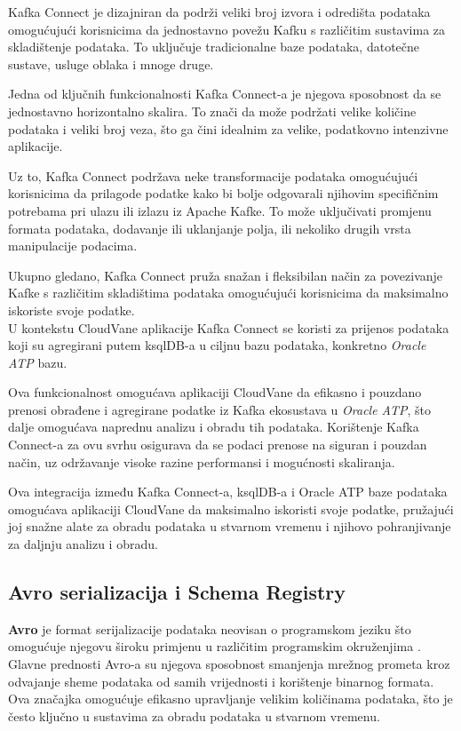 \documentclass[times, utf8, diplomski]{fer}
\begin{document}
Kafka Connect je dizajniran da podrži veliki broj izvora  i odredišta  podataka omogućujući korisnicima da jednostavno povežu Kafku s različitim sustavima za skladištenje podataka. To uključuje tradicionalne baze podataka, datotečne sustave, usluge oblaka i mnoge druge.

Jedna od ključnih funkcionalnosti Kafka Connect-a je njegova sposobnost da se jednostavno horizontalno skalira. To znači da može podržati velike količine podataka i veliki broj veza, što ga čini idealnim za velike, podatkovno intenzivne aplikacije.

Uz to, Kafka Connect podržava neke transformacije podataka omogućujući korisnicima da prilagode podatke kako bi bolje odgovarali njihovim specifičnim potrebama pri ulazu ili izlazu iz Apache Kafke. To može uključivati promjenu formata podataka, dodavanje ili uklanjanje polja, ili nekoliko drugih vrsta manipulacije podacima.

Ukupno gledano, Kafka Connect pruža snažan i fleksibilan način za povezivanje Kafke s različitim skladištima podataka omogućujući korisnicima da maksimalno iskoriste svoje podatke. \\

U kontekstu CloudVane aplikacije Kafka Connect se koristi za prijenos podataka koji su agregirani putem ksqlDB-a u ciljnu bazu podataka, konkretno \emph{Oracle ATP}  bazu.

Ova funkcionalnost omogućava aplikaciji CloudVane da efikasno i pouzdano prenosi obrađene i agregirane podatke iz Kafka ekosustava u \emph{Oracle ATP}, što dalje omogućava naprednu analizu i obradu tih podataka. Korištenje Kafka Connect-a za ovu svrhu osigurava da se podaci prenose na siguran i pouzdan način, uz održavanje visoke razine performansi i mogućnosti skaliranja.

Ova integracija između Kafka Connect-a, ksqlDB-a i Oracle ATP baze podataka omogućava aplikaciji CloudVane da maksimalno iskoristi svoje podatke, pružajući joj snažne alate za obradu podataka u stvarnom vremenu i njihovo pohranjivanje za daljnju analizu i obradu.

\clearpage
\subsection{Avro serializacija i Schema Registry}
\label{sec:schema}

\textbf{Avro} je format serijalizacije podataka neovisan o programskom jeziku što omogućuje njegovu široku primjenu u različitim programskim okruženjima \citep{shapira_kafka_2021}. Glavne prednosti Avro-a su njegova sposobnost smanjenja mrežnog prometa kroz odvajanje sheme podataka od samih vrijednosti i korištenje binarnog formata. Ova značajka omogućuje efikasno upravljanje velikim količinama podataka, što je često ključno u sustavima za obradu podataka u stvarnom vremenu.
\end{document}
